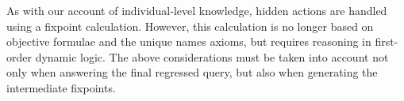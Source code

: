 As with our account of individual-level knowledge, hidden actions
are handled using a fixpoint calculation. However, this calculation
is no longer based on objective formulae and the unique names axioms,
but requires reasoning in first-order dynamic logic. The above considerations
must be taken into account not only when answering the final regressed
query, but also when generating the intermediate fixpoints.

